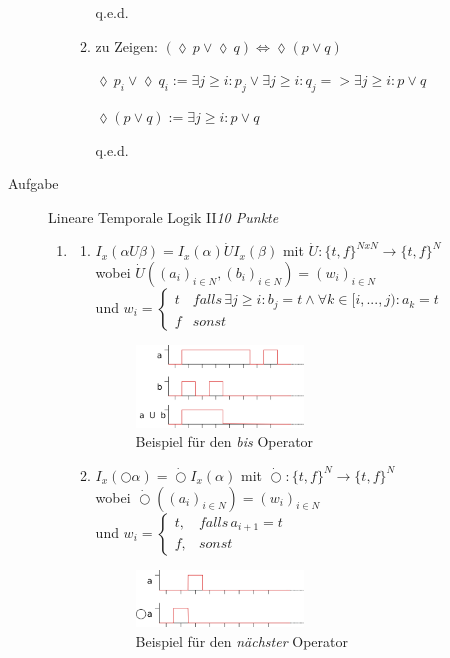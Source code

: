 \documentclass[a4paper,twoside,12pt]{article}
\newcounter{AUFGNR}
\newcommand{\AUFGABE}[2]{\vspace{0.3cm}\item[Aufgabe~\arabic{AUFGNR}]\stepcounter{AUFGNR} #1\hfill\emph{#2}}
\begin{document}
\begin{description}
\begin{enumerate}
\begin{enumerate}
q.e.d.

\item zu Zeigen: $(\lozenge\, p \vee \lozenge\, q) \Leftrightarrow \lozenge (p \vee q)$

$
\lozenge\, p_i \vee \lozenge\, q_i := \exists j \geq i: p_j \vee \exists j \geq i: q_j => \exists j \geq i: p \vee q
$

$
\lozenge (p \vee q) := \exists j \geq i: p \vee q
$

q.e.d.
\end{enumerate}
\end{enumerate}

\AUFGABE{Lineare Temporale Logik II}{10 Punkte}
\begin{enumerate}
\item
\begin{enumerate}
\item
$I_x(\alpha U \beta) = I_x(\alpha )\dot{U} I_x(\beta)$ mit $\dot{U}: \{t,f\}^{N x N} \rightarrow \{t,f\}^N$ \\
wobei $\dot{U}((a_i)_{i\in N}, (b_i)_{i\in N}) = (w_i)_{i\in N}$\\
und $w_i = \begin{cases} t & falls\, \exists j\geq i: b_j = t \land \forall k\in [i, ..., j): a_k = t \\ f & sonst \end{cases}$
\begin{figure}
  \includegraphics[width=0.5\textwidth]{2_a_1.png}
\caption{Beispiel für den \textit{bis} Operator}
\end{figure}  

\item
$I_x(\bigcirc \alpha) = \dot{\bigcirc} I_x(\alpha )$ mit $\dot{\bigcirc}: \{t,f\}^N \rightarrow \{t,f\}^N$ \\
wobei $\dot{\bigcirc}((a_i)_{i\in N}) = (w_i)_{i\in N}$\\
und $w_i = \begin{cases}
 t, & falls\, a_{i+1} = t\\
 f, & sonst 
 \end{cases}$  
 	\begin{figure}
 	   \includegraphics[width=0.5\textwidth]{2_a_2.png}
	\caption{Beispiel für den \textit{nächster} Operator}
 	\end{figure}


\end{enumerate}
\end{enumerate}
\end{description}
\end{document}
